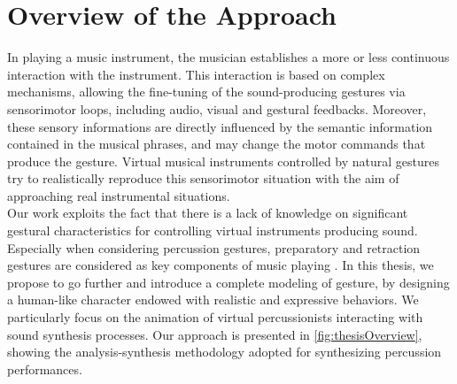 \chapter{Overview of the Approach}
\label{chapter:ThesisOverview}



In playing a music instrument, the musician establishes a more or less continuous interaction with the instrument. This interaction is based on complex mechanisms, allowing the fine-tuning of the sound-producing gestures via sensorimotor loops, including audio, visual and gestural feedbacks. Moreover, these sensory informations are directly influenced by the semantic information contained in the musical phrases, and may change the motor commands that produce the gesture. Virtual musical instruments controlled by natural gestures try to realistically reproduce this sensorimotor situation with the aim of approaching real instrumental situations.\\

Our work exploits the fact that there is a lack of knowledge on significant gestural characteristics for controlling virtual instruments producing sound. Especially when considering percussion gestures, preparatory and retraction gestures are considered as key components of music playing . In this thesis, we propose to go further and introduce a complete modeling of gesture, by designing a human-like character endowed with realistic and expressive behaviors. We particularly focus on the animation of virtual percussionists interacting with sound synthesis processes. Our approach is presented in \myfigname \ref{fig:thesisOverview}, showing the analysis-synthesis methodology adopted for synthesizing percussion performances.

